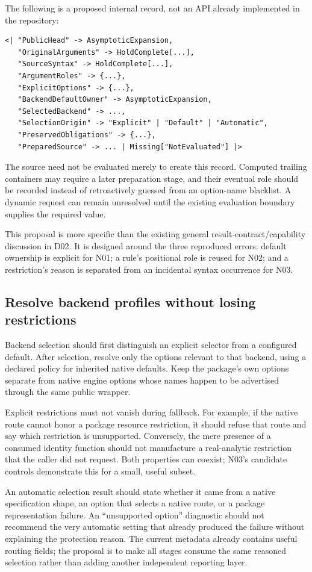 \documentclass[11pt]{article}
\begin{document}
The following is a proposed internal record, not an API already implemented in the repository:
\begin{lstlisting}
<| "PublicHead" -> AsymptoticExpansion,
   "OriginalArguments" -> HoldComplete[...],
   "SourceSyntax" -> HoldComplete[...],
   "ArgumentRoles" -> {...},
   "ExplicitOptions" -> {...},
   "BackendDefaultOwner" -> AsymptoticExpansion,
   "SelectedBackend" -> ...,
   "SelectionOrigin" -> "Explicit" | "Default" | "Automatic",
   "PreservedObligations" -> {...},
   "PreparedSource" -> ... | Missing["NotEvaluated"] |>
\end{lstlisting}
The source need not be evaluated merely to create this record. Computed trailing containers may require a later preparation stage, and their eventual role should be recorded instead of retroactively guessed from an option-name blacklist. A dynamic request can remain unresolved until the existing evaluation boundary supplies the required value.

This proposal is more specific than the existing general result-contract/capability discussion in D02. It is designed around the three reproduced errors: default ownership is explicit for N01; a rule's positional role is reused for N02; and a restriction's reason is separated from an incidental syntax occurrence for N03.

\subsection{Resolve backend profiles without losing restrictions}
Backend selection should first distinguish an explicit selector from a configured default. After selection, resolve only the options relevant to that backend, using a declared policy for inherited native defaults. Keep the package's own options separate from native engine options whose names happen to be advertised through the same public wrapper.

Explicit restrictions must not vanish during fallback. For example, if the native route cannot honor a package resource restriction, it should refuse that route and say which restriction is unsupported. Conversely, the mere presence of a consumed identity function should not manufacture a real-analytic restriction that the caller did not request. Both properties can coexist; N03's candidate controls demonstrate this for a small, useful subset.

An automatic selection result should state whether it came from a native specification shape, an option that selects a native route, or a package representation failure. An ``unsupported option'' diagnostic should not recommend the very automatic setting that already produced the failure without explaining the protection reason. The current metadata already contains useful routing fields; the proposal is to make all stages consume the same reasoned selection rather than adding another independent reporting layer.\cite{bridge,contracts}
\end{document}
